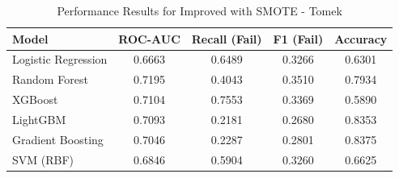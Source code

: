 \begin{table}[htbp]
\caption{Performance Results for Improved with SMOTE - Tomek}
\label{tab:improved_smote - tomek}
\begin{tabular}{lcccc}
\toprule

Model & ROC-AUC & Recall (Fail) & F1 (Fail) & Accuracy \\
\midrule

Logistic Regression & 0.6663 & 0.6489 & 0.3266 & 0.6301 \\
Random Forest & 0.7195 & 0.4043 & 0.3510 & 0.7934 \\
XGBoost & 0.7104 & 0.7553 & 0.3369 & 0.5890 \\
LightGBM & 0.7093 & 0.2181 & 0.2680 & 0.8353 \\
Gradient Boosting & 0.7046 & 0.2287 & 0.2801 & 0.8375 \\
SVM (RBF) & 0.6846 & 0.5904 & 0.3260 & 0.6625 \\
\bottomrule

\end{tabular}
\end{table}
